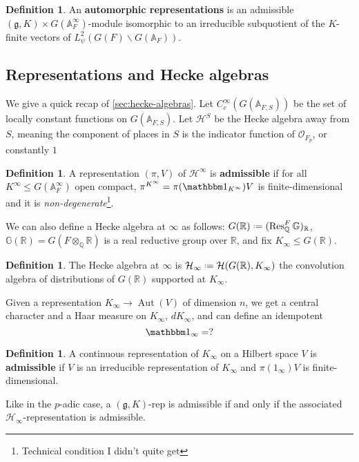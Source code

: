\documentclass[11pt]{report}
\let\mbb\mathbb
\let\mc\mathcal
\let\mf\mathfrak
\newcommand{\1}{\mathbbm 1}
\newcommand{\Q}{\mathbb{Q}}
\newcommand{\R}{\mathbb{R}}
\newcommand{\g}{\mf g}
\newcommand{\A}{\mbb A}
\renewcommand{\O}{\mc O}
\newcommand*{\defeq}{\mathrel{\vcenter{\baselineskip0.5ex \lineskiplimit0pt
      \hbox{\scriptsize.}\hbox{\scriptsize.}}}%
  =}
\DeclareMathOperator{\Aut}{Aut}
\theoremstyle{plain}
\newcounter{ex}
\theoremstyle{definition}
\newtheorem{mydef}[thm]{Definition}
\theoremstyle{remark}
\numberwithin{equation}{section}
\begin{document}
\begin{mydef}
  An \textbf{automorphic representations} is an admissible
  $(\g,K)\times G(\A^{\infty}_{F})$-module isomorphic to an irreducible subquotient of the
  $K$-finite vectors of $L^{2}_{\psi}(G(F) \backslash G(\A_{F}))$.
\end{mydef}


\subsection{Representations and Hecke algebras}
\label{sec:repr-hecke-algebr}
We give a quick recap of \cref{sec:hecke-algebras}. Let
$C_{c}^{\infty}(G(\A_{F,S}))$ be the set of locally constant functions on
$G(\A_{F,S})$.
Let $\mc H^{S}$ be the Hecke algebra away from $S$, meaning 
the component of places in $S$ is the indicator function of
$\O_{F_{p}}$, or constantly $1$ 

\begin{mydef}
  A representation $(\pi,V)$ of $\mc H^{\infty}$ is \textbf{admissible} if
  for all $K^{\infty}\le G(\A^{\infty}_{F})$ open compact,
  $\pi^{K^{\infty}} = \pi(\1_{K^{\infty}})V$ is finite-dimensional and it is
  \emph{non-degenerate}\footnote{Technical condition I didn't quite
    get}.
\end{mydef}

We can also define a Hecke algebra at $\infty$ as follows:
$G(\R) \defeq (\Res^{F}_{\Q} \mbb G)_{\R}$,
$\mbb G(\R) = G(F\otimes_{\Q} \R)$ is a real reductive group over $\R$, and
fix $K_{\infty}\le G(\R)$.

\begin{mydef}
  The Hecke algebra at $\infty$ is $\mc H_{\infty}\defeq \mc H(G(\R),K_{\infty})$
  the convolution algebra of distributions of $G(\R)$ supported at
  $K_{\infty}$. 
\end{mydef}
Given a representation  $K_{\infty} \to \Aut(V)$ of dimension $n$, we get a
central character and a Haar measure on $K_{\infty}$, $dK_{\infty}$, and can
define an idempotent
\begin{equation}
  \label{eq:14}
\1_{\infty}  = ? 
\end{equation}

\begin{mydef}
  A continuous representation of $K_{\infty}$ on a Hilbert space $V$ is
  \textbf{admissible} if $V$ is an irreducible representation of
  $K_{\infty}$ and $\pi(1_{\infty})V$ is finite-dimensional.
\end{mydef}
Like in the $p$-adic case, a $(\g,K)$-rep is admissible if and only if
the associated $\mc H_{\infty}$-representation is admissible.
\end{document}
